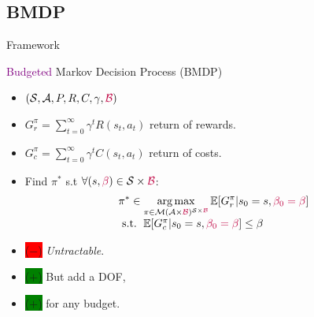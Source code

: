 \documentclass{beamer}
\newcommand{\cplus}{\colorbox{green}{($+$)} }
\newcommand{\cmoins}{\colorbox{red}{($-$)} }
\begin{document}
    \subsection{BMDP}

    \begin{frame}{Framework}

        \begin{block}{\textcolor{purple}{Budgeted} Markov Decision Process (BMDP)}
            \begin{itemize}
                \item $(\mathcal{S}, \mathcal{A}, P, R,{C}, \gamma,\textcolor{purple}{\mathcal{B}})$
                \item $G_r^\pi = \sum_{t=0}^\infty \gamma^t R(s_t, a_t)$ return of rewards.
                \item  $G_c^\pi = \sum_{t=0}^\infty \gamma^t C(s_t, a_t)$ return of costs.
                \item Find $\pi^*$ s.t $\forall (s,\textcolor{purple}{\beta})\in\mathcal{S}\times\textcolor{purple}{\mathcal{B}}$:
                \begin{equation}
                    \label{eq:bmdp}
                    \begin{array}{lcr}
                        \displaystyle \pi^* \in \operatorname*{arg\,max}_{\pi\in\mathcal{M}(\mathcal{A}\times\textcolor{purple}{\mathcal{B}})^{\mathcal{S}\times\textcolor{purple}{\mathcal{B}}}} \operatorname*{\mathbb{E}}[G_r^\pi | s_0=s,\textcolor{purple}{\beta_0=\beta}] \\
                        \text{ s.t. }  \operatorname*{\mathbb{E}}[G_c^\pi | s_0=s,\textcolor{purple}{\beta_0=\beta}] \leq \beta
                    \end{array}
                \end{equation}
            \end{itemize}
        \end{block}


        \begin{block}{}
            \begin{itemize}
                \item \cmoins \textit{Untractable}.
                \item \cplus But add a DOF,
                \item \cplus for any budget.

            \end{itemize}
        \end{block}

    \end{frame}
\end{document}
